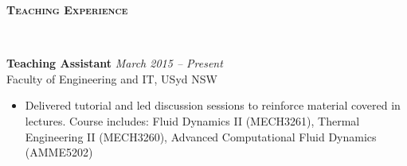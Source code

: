 \documentclass[letterpaper, 10pt]{article}
\newenvironment{changemargin}[2]{%
  \begin{list}{}{%
      \setlength{\topsep}{0pt}%
      \setlength{\leftmargin}{#1}%
      \setlength{\rightmargin}{#2}%
      \setlength{\listparindent}{\parindent}%
      \setlength{\itemindent}{\parindent}%
      \setlength{\parsep}{\parskip}%
    }%
  \item[]}{\end{list}
}
\newcommand{\lineover}{
  \begin{changemargin}{-0.05in}{-0.05in}
    \vspace*{-8pt}
    \hrulefill \\
    \vspace*{-2pt}
  \end{changemargin}
}
\newcommand{\header}[1]{
  \begin{changemargin}{-0.5in}{-0.5in}
    \textbf{\scshape{#1}}\\
    \lineover
  \end{changemargin}
}
\newenvironment{body} {
  \vspace*{-16pt}
  \begin{changemargin}{-0.25in}{-0.5in}
  }
  {\end{changemargin}
}
\begin{document}
\smallskip
\header{Teaching Experience}
\begin{body}
	\vspace{14pt}
	\textbf{Teaching Assistant} \hfill \emph{March 2015 -- Present}\\
	Faculty of Engineering and IT, USyd \hfill NSW
	\vspace{-2pt}
	\begin{itemize}
		\setlength{\itemindent}{0in}
		\setlength{\itemsep}{0in}
		\item Delivered tutorial and led discussion sessions to reinforce material covered in
		lectures. Course includes: Fluid Dynamics II (MECH3261), Thermal Engineering II (MECH3260), Advanced Computational Fluid Dynamics (AMME5202)
	\end{itemize}
\end{body}
\smallskip
\end{document}
